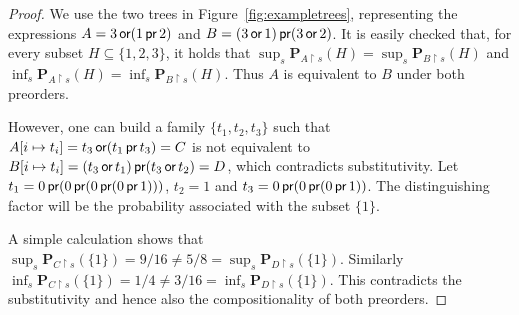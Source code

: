 \begin{proof}
    We use the two trees in Figure~\ref{fig:exampletrees},
    representing the expressions $A = 3 \operatorname{\textsf{or}} (1 \operatorname{\textsf{pr}} 2)$
    and $B = (3 \operatorname{\textsf{or}} 1) \operatorname{\textsf{pr}} (3 \operatorname{\textsf{or}} 2)$. It is easily checked that, for every subset $H \subseteq \{ 1, 2, 3 \}$,
    it holds that $\sup_s  \mathbf{P}_{A\restriction s} (H) =  \sup_s \mathbf{P}_{B\restriction s} (H)$ and
    $\inf_s  \mathbf{P}_{A\restriction s} (H) =  \inf_s \mathbf{P}_{B\restriction s} (H)$.
     Thus $A$ is equivalent 
    to $B$ under  both preorders.

    However, one can build a family $\{ t_1, t_2, t_3\}$ such that 
    $A[ i \mapsto t_i] = t_3 \operatorname{\textsf{or}} (t_1 \operatorname{\textsf{pr}} t_3) = C$ is not equivalent to 
    $B[ i\mapsto t_i] = (t_3 \operatorname{\textsf{or}} t_1) \operatorname{\textsf{pr}} (t_3 \operatorname{\textsf{or}} t_2) = D$,
    which contradicts substitutivity.
    Let $t_1 = 0 \operatorname{\textsf{pr}} (0 \operatorname{\textsf{pr}} (0 \operatorname{\textsf{pr}} (0 \operatorname{\textsf{pr}} 1)))$,
    $t_2 = 1$ and $t_3 = 0 \operatorname{\textsf{pr}} (0 \operatorname{\textsf{pr}} (0 \operatorname{\textsf{pr}} 1))$. The distinguishing 
    factor will be the probability associated with the subset $\{ 1 \}$.

    A simple calculation shows that $\sup_s  \mathbf{P}_{C\restriction s} (\{1\}) = 9/16
    \neq 5/8 = \sup_s \mathbf{P}_{D\restriction s} (\{ 1\})$. Similarly
    $\inf_s  \mathbf{P}_{C\restriction s} (\{1\}) = 1/4 \neq 3/16 =
     \inf_s \mathbf{P}_{D \restriction s } (\{1\})$.
     This contradicts the substitutivity and hence also the compositionality of both preorders.
    
\end{proof}




